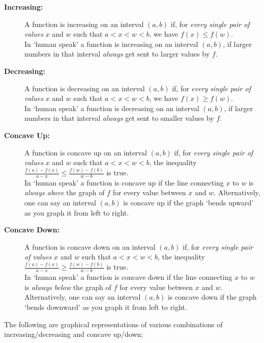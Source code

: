 \documentclass{ximera}
\begin{document}
\begin{description}
    \item[\textbf{Increasing:}] A function is increasing on an interval $(a,b)$ if, for \textit{every single pair of values} $x$ and $w$ such that  $a < x < w < b$, we have $f(x) \leq f(w)$.\\
     In `human speak' a function is increasing on an interval $(a,b)$, if larger numbers in that interval \textit{always} get sent to larger values by $f$.
    \item[\textbf{Decreasing:}] A function is decreasing on an interval $(a,b)$ if, for \textit{every single pair of values} $x$ and $w$ such that  $a < x < w < b$, we have $f(x) \geq f(w)$.\\
     In `human speak' a function is decreasing on an interval $(a,b)$, if larger numbers in that interval \textit{always} get sent to smaller values by $f$.
    \item[\textbf{Concave Up:}] A function is concave up on an interval $(a,b)$ if, for \textit{every single pair of values} $x$ and $w$ such that  $a < x < w < b$, the inequality $\frac{f(a) - f(x)}{a-x} \leq \frac{f(w)-f(b)}{w-b}$ is true.\\
     In `human speak' a function is concave up if the line connecting $x$ to $w$ is \textit{always above} the graph of $f$ for every value between $x$ and $w$. Alternatively, one can say an interval $(a,b)$ is concave up if the graph `bends upward' as you graph it from left to right.
    \item[\textbf{Concave Down:}] A function is concave down on an interval $(a,b)$ if, for \textit{every single pair of values} $x$ and $w$ such that  $a < x < w < b$, the inequality $\frac{f(a) - f(x)}{a-x} \geq \frac{f(w)-f(b)}{w-b}$ is true.\\
    In `human speak' a function is concave down if the line connecting $x$ to $w$ is \textit{always below} the graph of $f$ for every value between $x$ and $w$. Alternatively, one can say an interval $(a,b)$ is concave down if the graph `bends downward' as you graph it from left to right.
\end{description}

The following are graphical representations of various combinations of increasing/decreasing and concave up/down;
\end{document}
